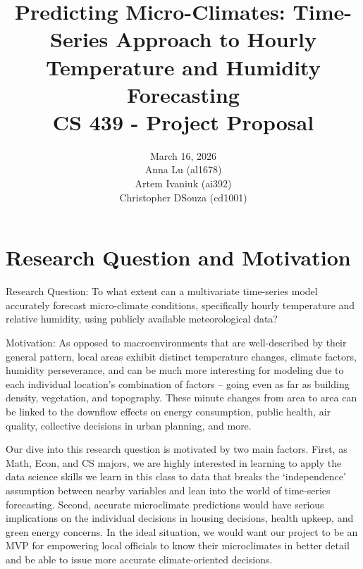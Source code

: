 \documentclass{article}
\title{Predicting Micro-Climates: Time-Series Approach to Hourly Temperature and Humidity Forecasting \\ 
\large CS 439 - Project Proposal}
\author{%
      \begin{center}
        {\large March 16, 2026} \\
        {\large Anna Lu (al1678)} \\
        {\large Artem Ivaniuk (ai392)} \\
        {\large Christopher DSouza (cd1001)} \\
        \vspace{0.5cm}
    \end{center}
}
\begin{document}
\maketitle


\section{Research Question and Motivation}

Research Question: To what extent can a multivariate time-series model accurately forecast micro-climate conditions, specifically hourly temperature and relative humidity, using publicly available meteorological data?

Motivation: 
As opposed to macroenvironments that are well-described by their general pattern, local areas exhibit distinct temperature changes, climate factors, humidity perseverance, and can be much more interesting for modeling due to each individual location's combination of factors -- going even as far as building density, vegetation, and topography. These minute changes from area to area can be linked to the downflow effects on energy consumption, public health, air quality, collective decisions in urban planning, and more. 


Our dive into this research question is motivated by two main factors. First, as Math, Econ, and CS majors, we are highly interested in learning to apply the data science skills we learn in this class to data that breaks the `independence' assumption between nearby variables and lean into the world of time-series forecasting. Second, accurate microclimate predictions would have serious implications on the individual decisions in housing decisions, health upkeep, and green energy concerns. In the ideal situation, we would want our project to be an MVP for empowering local officials to know their microclimates in better detail and be able to issue more accurate climate-oriented decisions. 
\end{document}
